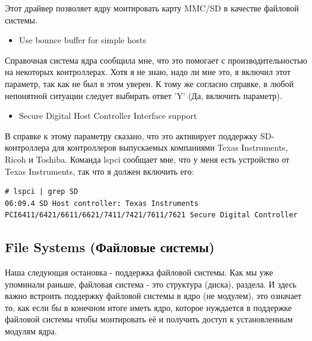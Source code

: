 \documentclass[10pt]{book}
\begin{document}
Этот драйвер позволяет ядру монтировать карту MMC/SD в качестве файловой системы.

\begin{itemize}
\item Use bounce buffer for simple hosts
\end{itemize}

Справочная система ядра сообщила мне, что это помогает с производительностью на некоторых контроллерах. Хотя я не знаю, надо ли мне это, я включил этот параметр, так как не был в этом уверен. К тому же согласно справке, в любой непонятной ситуации следует выбирать ответ 'Y' (Да, включить параметр).

\begin{itemize}
\item Secure Digital Host Controller Interface support
\end{itemize}

В справке к этому параметру сказано, что это активирует поддержку SD-контроллера для контроллеров выпускаемых компаниями Texas Instruments, Ricoh и Toshiba. Команда lspci сообщает мне, что у меня есть устройство от Texas Instruments, так что я должен включить его:

\begin{tcolorbox}[colback=gray!14!white, colframe=blue!75!blue]
\begin{lstlisting}
# lspci | grep SD
06:09.4 SD Host controller: Texas Instruments PCI6411/6421/6611/6621/7411/7421/7611/7621 Secure Digital Controller
\end{lstlisting}
\end{tcolorbox}

\subsection{File Systems (Файловые системы)}

Наша следующая остановка - поддержка файловой системы. Как мы уже упоминали раньше, файловая система - это структура (диска), раздела. И здесь важно встроить поддержку файловой системы в ядро (не модулем), это означает то, как если бы в конечном итоге иметь ядро, которое нуждается в поддержке файловой системы чтобы монтировать её и получить доступ к установленным модулям ядра.
\end{document}
